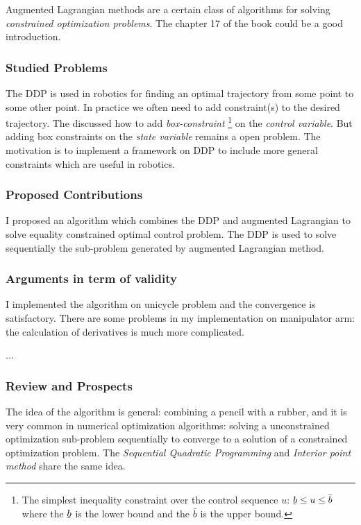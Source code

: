 \documentclass{report}
\begin{document}
Augmented Lagrangian methods are a certain class of algorithms for solving \emph{constrained optimization problems}. The chapter 17 of the book \cite{NoceWrig06} could be a good introduction. 

\subsubsection{Studied Problems}
The DDP is used in robotics for finding an optimal trajectory from some point to some other point. In practice we often need to add constraint(s) to the desired trajectory. The \cite{TassaICRA14} discussed how to add \emph{box-constraint} \footnote{The simplest inequality constraint over the control sequence $u$: $\underaccent{\bar}{b} \le u \le \bar{b}$ where the $\underaccent{\bar}{b}$ is the lower bound and the $\bar{b}$ is the upper bound.} on the \emph{control variable}. But adding box constraints on the \emph{state variable} remains a open problem. The motivation is to implement a framework on DDP to include more general constraints which are useful in robotics.

\subsubsection{Proposed Contributions}
I proposed an algorithm which combines the DDP and augmented Lagrangian to solve equality constrained optimal control problem. The DDP is used to solve sequentially the sub-problem generated by augmented Lagrangian method.

\subsubsection{Arguments in term of validity}
I implemented the algorithm on unicycle problem and the convergence is satisfactory. There are some problems in my implementation on manipulator arm: the calculation of derivatives is much more complicated.

...

\subsubsection{Review and Prospects}
The idea of the algorithm is general: combining a pencil with a rubber, and it is very common in numerical optimization algorithms: solving a unconstrained optimization sub-problem sequentially to converge to a solution of a constrained optimization problem. The \emph{Sequential Quadratic Programming} and \emph{Interior point method} share the same idea.
\end{document}
